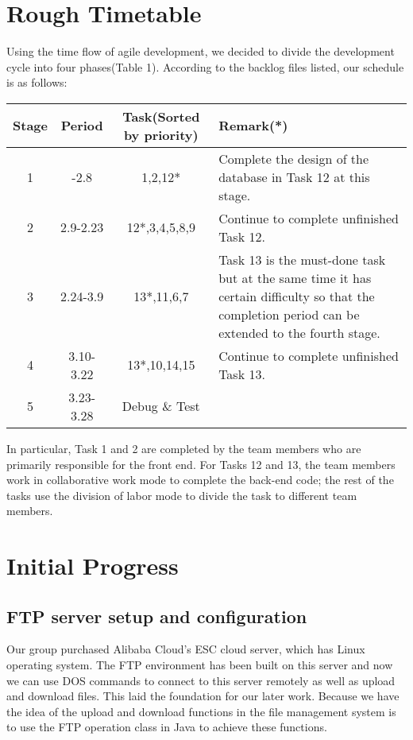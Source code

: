 \documentclass[a4paper,11pt]{article}
\begin{document}
\section{Rough Timetable}
Using the time flow of agile development, we decided to divide the development cycle into four phases(Table 1). According to the backlog files listed, our schedule is as follows:
\begin{table}[H]
\centering
\begin{tabular}{|c|c|c|p{8cm}|}
\hline
Stage & Period & Task(Sorted by priority) & Remark(*) \\
\hline
1 & -2.8 & 1,2,12* & Complete the design of the database in Task 12 at this stage. \\
\hline
2 & 2.9-2.23 & 12*,3,4,5,8,9 & Continue to complete
unfinished Task 12.
 \\
\hline
3 & 2.24-3.9 & 13*,11,6,7 & Task 13 is the must-done task but at the same time it has certain difficulty so that the completion period can be extended to the fourth stage. \\
\hline
4 & 3.10-3.22 & 13*,10,14,15 & Continue to complete
unfinished Task 13.
\\
\hline
5 & 3.23-3.28 & Debug \& Test &
\\
\hline
\end{tabular}
\end{table}
In particular, Task 1 and 2 are completed by the team members who are primarily responsible for the front end. For Tasks 12 and 13, the team members work in collaborative work mode to complete the back-end code; the rest of the tasks use the division of labor mode to divide the task to different team members.
\section{Initial Progress}
\subsection{FTP server setup and configuration}
Our group purchased Alibaba Cloud’s ESC cloud server, which has Linux operating system. The FTP environment has been built on this server and now we can use DOS commands to connect to this server remotely as well as upload and download files. This laid the foundation for our later work. Because we have the idea of the upload and download functions in the file management system is to use the FTP operation class in Java to achieve these functions.
\end{document}
